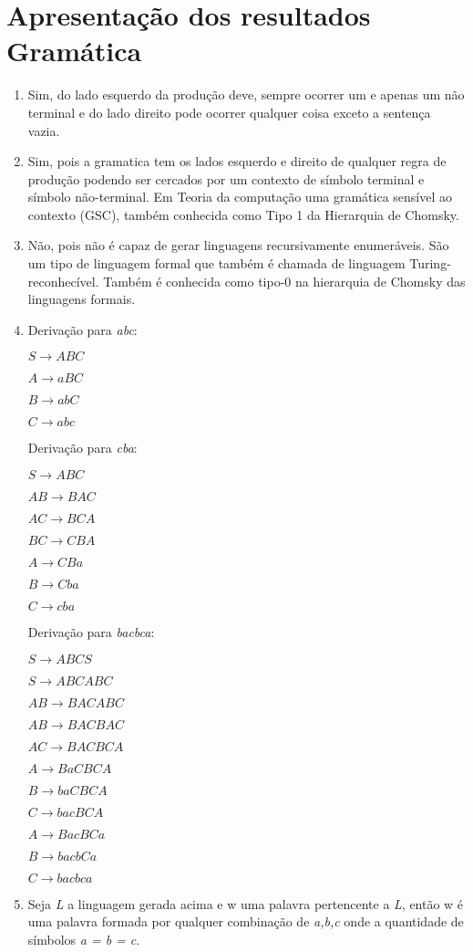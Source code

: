 \documentclass[
	12pt,				%
	openright,			%
	twoside,			%
	a4paper,			%
	english,			%
	french,				%
	spanish,			%
	brazil,				%
	]{abntex2}
\begin{document}
\section{Apresentação dos resultados Gramática}

\begin{enumerate}[label=\alph*.]
  \item Sim, do lado esquerdo da produção deve, sempre ocorrer um e apenas um não terminal e do lado direito pode ocorrer qualquer coisa exceto a sentença vazia.

  \item Sim, pois a gramatica tem os lados esquerdo e direito de qualquer regra de produção podendo ser cercados por um contexto de símbolo terminal e símbolo não-terminal.
  Em Teoria da computação uma gramática sensível ao contexto (GSC), também conhecida como Tipo 1 da Hierarquia de Chomsky.

  \item Não, pois não é capaz de gerar linguagens recursivamente enumeráveis. São um tipo de linguagem formal que também é chamada de linguagem Turing-reconhecível. Também é conhecida como tipo-0 na hierarquia de Chomsky das linguagens formais.\\

  \item Derivação para \emph{abc}:

    $S  \rightarrow ABC$

    $A  \rightarrow aBC$

$B  \rightarrow abC$

$C  \rightarrow abc$

Derivação para \emph{cba}:

$S  \rightarrow ABC$

$AB  \rightarrow BAC$

$AC  \rightarrow BCA$

$BC  \rightarrow CBA$

$A  \rightarrow CBa$

$B  \rightarrow Cba$

$C  \rightarrow cba$

Derivação para \emph{bacbca}:

$S  \rightarrow ABCS$

$S  \rightarrow ABCABC$

$AB  \rightarrow BACABC$

$AB  \rightarrow BACBAC$

$AC  \rightarrow BACBCA$

$A  \rightarrow BaCBCA$

$B  \rightarrow baCBCA$

$C  \rightarrow bacBCA$

$A  \rightarrow BacBCa$

$B  \rightarrow bacbCa$

$C  \rightarrow bacbca$ \\


\item Seja \emph{L} a linguagem gerada acima e w uma palavra pertencente a \emph{L}, então w é uma palavra formada por qualquer combinação de \emph{a,b,c} onde a quantidade de símbolos \emph{a = b = c}.

\end{enumerate}
\end{document}
